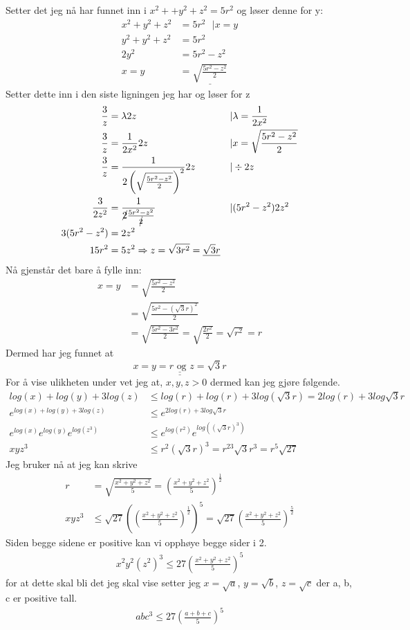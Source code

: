 \documentclass[a4paper,12pt,norsk]{article}
\begin{document}
Setter det jeg nå har funnet inn i $x^2 + +y^2 + z^2 =5r^2$ og løser denne for y:
\begin{align*}
x^2+y^2 + z^2 &=5r^2 \text{ } | x=y\\
y^2+y^2 + z^2 &= 5r^2\\
2y^2 &= 5r^2 - z^2\\
x = y &= \underline{\sqrt{\frac{5r^2 - z^2}{2}}}
\end{align*}
Setter dette inn i den siste ligningen jeg har og løser for z
\begin{align*}
\frac{3}{z} &= \lambda 2z &|& \lambda = \frac{1}{2x^2}\\
\frac{3}{z} &=  \frac{1}{2x^2} 2z &|& x = \sqrt{\frac{5r^2 - z^2}{2}}\\
\frac{3}{z} &=  \frac{1}{2\left(\sqrt{\frac{5r^2 - z^2}{2}}\right)^2} 2z &|& \div 2z\\
\frac{3}{2z^2} &=  \frac{1}{\cancel{2}\frac{5r^2 - z^2}{\cancel{2}}} &|& (5r^2 - z^2)2z^2\\
3(5r^2 - z^2) &= 2z^2 \\
15r^2 &=5z^2 \Rightarrow z = \sqrt{3r^2} =\underline{\sqrt{3}r}
\end{align*}
Nå gjenstår det bare å fylle inn:
\begin{align*}
x=y&=\sqrt{\frac{5r^2 - z^2}{2}} \\
&=\sqrt{\frac{5r^2 - (\sqrt{3}r)^2}{2}}\\
&= \sqrt{\frac{5r^2 - 3r^2}{2}} = \sqrt{\frac{2r^2}{2}} = \sqrt{r^2} = r
\end{align*}
Dermed har jeg funnet at $$ \underline{\underline{x=y=r \text{ og } z = \sqrt{3}r}}$$
For å vise ulikheten under vet jeg at, $x,y,z>0$ dermed kan jeg gjøre følgende.
\begin{align*}
log(x) + log(y) + 3log(z) &\leq log(r) + log(r) +3log(\sqrt{3}r) = 2log(r) + 3log{\sqrt{3}r} \\
e^{log(x) + log(y) + 3log(z)} &\leq e^{2log(r) + 3log{\sqrt{3}r}} \\
e^{log(x)}e^{log(y)}e^{log(z^3)} &\leq e^{log(r^2)}e^{log((\sqrt{3}r)^3)}\\
xyz^3 &\leq r^2(\sqrt{3}r)^3 = r^23\sqrt{3}r^3 = r^5\sqrt{27}
\end{align*}
Jeg bruker nå at jeg kan skrive
\begin{align*}
r &= \sqrt{\frac{x^2 + y^2 + z^2}{5}} =\left(\frac{x^2 + y^2 + z^2}{5}\right)^{\frac{1}{2}}\\
xyz^3 &\leq \sqrt{27}\left(\left(\frac{x^2 + y^2 + z^2}{5}\right)^{\frac{1}{2}}\right)^5 = \sqrt{27}\left(\frac{x^2 + y^2 + z^2}{5}\right)^{\frac{5}{2}}
\end{align*}
Siden begge sidene er positive kan vi opphøye begge sider i 2.
\begin{align*}
x^2y^2(z^2)^3\leq 27\left(\frac{x^2 + y^2 + z^2}{5}\right)^5
\end{align*}
for at dette skal bli det jeg skal vise setter jeg $x=\sqrt{a}$, $y=\sqrt{b}$, $z=\sqrt{c}$ der a, b, c er positive tall.
\begin{align*}
abc^3\leq 27\left(\frac{a+b+c}{5}\right)^5
\end{align*}
\end{document}
